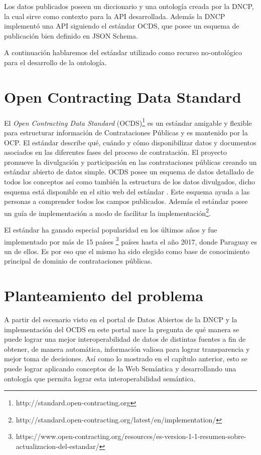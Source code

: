 Los datos publicados poseen un diccionario y una ontología creada por la DNCP, la cual sirve como contexto para la API desarrollada. Además la DNCP implementó una API siguiendo el estándar OCDS, que posee un esquema de publicación bien definido en JSON Schema.

A continuación hablaremos del estándar utilizado como recurso no-ontológico para el desarrollo de la ontología.

\section{Open Contracting Data Standard}
\label{section:OCDS}

El \textit{Open Contracting Data Standard} (OCDS)\footnote{http://standard.open-contracting.org}  es un estándar amigable y flexible para estructurar información de Contrataciones Públicas y es mantenido por la OCP. El estándar describe qué, cuándo y cómo disponibilizar datos y documentos asociados en las diferentes fases del proceso de contratación. El proyecto promueve la divulgación y participación en las contrataciones públicas creando un estándar abierto de datos simple. OCDS posee un esquema de datos detallado de todos los conceptos así como también la estructura de los datos divulgados, dicho esquema está disponible en el sitio web del estándar \cite{OCDSReleaseSchema:online}. Este esquema ayuda a las personas a comprender todos los campos publicados. Además el estándar posee un guía de implementación a modo de facilitar la implementación\footnote{http://standard.open-contracting.org/latest/en/implementation/}.

El estándar ha ganado especial popularidad en los últimos años y fue implementado por más de 15 países \footnote{https://www.open-contracting.org/resources/es-version-1-1-resumen-sobre-actualizacion-del-estandar/} países hasta el año 2017, donde Paraguay es un de ellos. Es por eso que el mismo ha sido elegido como base de conocimiento principal de dominio de contrataciones públicas.

\section{Planteamiento del problema}
\label{section:planteamientoDelProblema}

A partir del escenario visto en el portal de Datos Abiertos de la DNCP y la implementación del OCDS en este portal nace la pregunta de qué manera se puede lograr una mejor interoperabilidad de datos de distintas fuentes a fin de obtener, de manera automática, información valiosa para lograr transparencia y mejor toma de decisiones. Así como lo mostrado en el capítulo anterior, esto se puede lograr aplicando conceptos de la Web Semántica y desarrollando una ontología que permita lograr esta interoperabilidad semántica. 

